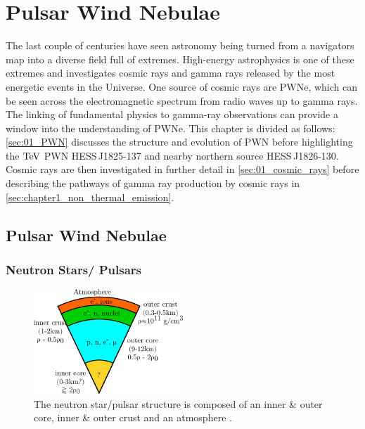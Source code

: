 \chapter{Pulsar Wind Nebulae} \label{sec:01_PWN_chapter}

The last couple of centuries have seen astronomy being turned from a navigators map into a diverse field full of extremes. High-energy astrophysics is one of these extremes and investigates cosmic rays and gamma rays released by the most energetic events in the Universe. One source of cosmic rays are PWNe, which can be seen across the electromagnetic spectrum from radio waves up to gamma rays. The linking of fundamental physics to gamma-ray observations can provide a window into the understanding of PWNe.
This chapter is divided as follows: \autoref{sec:01_PWN} discusses the structure and evolution of PWN before highlighting the $\TeV$ PWN \mbox{HESS\,J1825-137} and nearby northern source \mbox{HESS\,J1826-130}. Cosmic rays are then investigated in further detail in \autoref{sec:01_cosmic_rays} before describing the pathways of gamma ray production by cosmic rays in \autoref{sec:chapter1_non_thermal_emission}.

\section{Pulsar Wind Nebulae} \label{sec:01_PWN}

\subsection{Neutron Stars/ Pulsars} \label{sec:01_PWN_pulsar}

\begin{figure}
	\centering
	\includegraphics[width=0.5\textwidth]{04_Introduction/Images/pulsar_wind_nebula/pulsar_structure.png}
	\caption{The neutron star/pulsar structure is composed of an inner \& outer core, inner \& outer crust and an atmosphere \citep{2007ASSL..326.....H}.}
	\label{fig:chapter1_pulsar_structure}
\end{figure}

